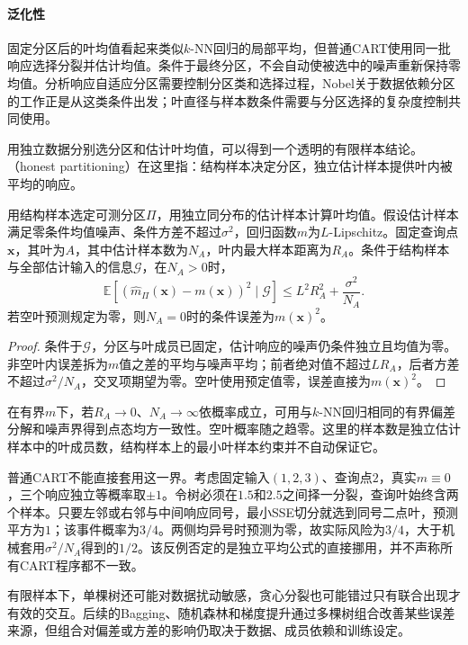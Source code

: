 \paragraph{泛化性}
固定分区后的叶均值看起来类似$k$-NN回归的局部平均，但普通CART使用同一批响应选择分裂并估计均值。条件于最终分区，不会自动使被选中的噪声重新保持零均值。分析响应自适应分区需要控制分区类和选择过程，Nobel关于数据依赖分区的工作正是从这类条件出发；叶直径与样本数条件需要与分区选择的复杂度控制共同使用。

用独立数据分别选分区和估计叶均值，可以得到一个透明的有限样本结论。（honest partitioning）在这里指：结构样本决定分区，独立估计样本提供叶内被平均的响应。

\begin{theorem}[独立分区下的叶平均误差]
  \label{thm:regression-honest-tree}
  用结构样本选定可测分区$\Pi$，用独立同分布的估计样本计算叶均值。假设估计样本满足零条件均值噪声、条件方差不超过$\sigma^2$，回归函数$m$为$L$-Lipschitz。固定查询点$\bm{x}$，其叶为$A$，其中估计样本数为$N_A$，叶内最大样本距离为$R_A$。条件于结构样本与全部估计输入的信息$\mathcal G$，在$N_A>0$时，
  \[
    \mathbb{E}[(\widehat m_\Pi(\bm{x})-m(\bm{x}))^2\mid\mathcal G]
    \leq L^2R_A^2+\frac{\sigma^2}{N_A}.
  \]
  若空叶预测规定为零，则$N_A=0$时的条件误差为$m(\bm{x})^2$。
\end{theorem}

\begin{proof}
条件于$\mathcal G$，分区与叶成员已固定，估计响应的噪声仍条件独立且均值为零。非空叶内误差拆为$m$值之差的平均与噪声平均；前者绝对值不超过$LR_A$，后者方差不超过$\sigma^2/N_A$，交叉项期望为零。空叶使用预定值零，误差直接为$m(\bm{x})^2$。
\end{proof}

在有界$m$下，若$R_A\to0$、$N_A\to\infty$依概率成立，可用与$k$-NN回归相同的有界偏差分解和噪声界得到点态均方一致性。空叶概率随之趋零。这里的样本数是独立估计样本中的叶成员数，结构样本上的最小叶样本约束并不自动保证它。

普通CART不能直接套用这一界。考虑固定输入$(1,2,3)$、查询点$2$，真实$m\equiv0$，三个响应独立等概率取$\pm1$。令树必须在$1.5$和$2.5$之间择一分裂，查询叶始终含两个样本。只要左邻或右邻与中间响应同号，最小SSE切分就选到同号二点叶，预测平方为$1$；该事件概率为$3/4$。两侧均异号时预测为零，故实际风险为$3/4$，大于机械套用$\sigma^2/N_A$得到的$1/2$。该反例否定的是独立平均公式的直接挪用，并不声称所有CART程序都不一致。

有限样本下，单棵树还可能对数据扰动敏感，贪心分裂也可能错过只有联合出现才有效的交互。后续的Bagging、随机森林和梯度提升通过多棵树组合改善某些误差来源，但组合对偏差或方差的影响仍取决于数据、成员依赖和训练设定。

